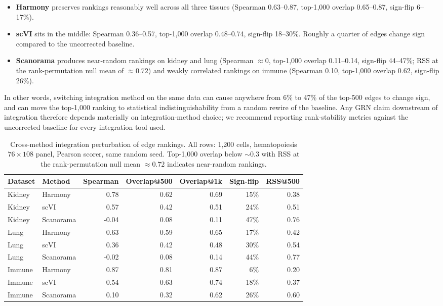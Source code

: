 \documentclass[12pt]{article}
\begin{document}
\begin{itemize}
\item \textbf{Harmony} preserves rankings reasonably well across all
      three tissues (Spearman 0.63--0.87, top-1{,}000 overlap
      0.65--0.87, sign-flip 6--17\%).
\item \textbf{scVI} sits in the middle: Spearman 0.36--0.57, top-1{,}000
      overlap 0.48--0.74, sign-flip 18--30\%. Roughly a quarter of
      edges change sign compared to the uncorrected baseline.
\item \textbf{Scanorama} produces near-random rankings on kidney and
      lung (Spearman $\approx 0$, top-1{,}000 overlap 0.11--0.14,
      sign-flip 44--47\%; RSS at the rank-permutation null mean of
      $\approx 0.72$) and weakly correlated rankings on immune
      (Spearman 0.10, top-1{,}000 overlap 0.62, sign-flip 26\%).
\end{itemize}

In other words, switching integration method on the same data can
cause anywhere from 6\% to 47\% of the top-500 edges to change sign,
and can move the top-1{,}000 ranking to statistical indistinguishability
from a random rewire of the baseline. Any GRN claim downstream of
integration therefore depends materially on integration-method choice;
we recommend reporting rank-stability metrics against the uncorrected
baseline for every integration tool used.

\begin{table}[ht]
\centering
\caption{Cross-method integration perturbation of edge rankings.
All rows: 1{,}200 cells, hematopoiesis $76 \times 108$ panel,
Pearson scorer, same random seed. Top-1{,}000 overlap below $\sim 0.3$
with RSS at the rank-permutation null mean $\approx 0.72$ indicates
near-random rankings.}
\label{tab:integration_methods}
\small
\begin{tabular}{llrrrrr}
\toprule
\textbf{Dataset} & \textbf{Method} & \textbf{Spearman} &
\textbf{Overlap@500} & \textbf{Overlap@1k} &
\textbf{Sign-flip} & \textbf{RSS@500} \\
\midrule
Kidney & Harmony    &  0.78 & 0.62 & 0.69 & 15\% & 0.38 \\
Kidney & scVI       &  0.57 & 0.42 & 0.51 & 24\% & 0.51 \\
Kidney & Scanorama  & -0.04 & 0.08 & 0.11 & 47\% & 0.76 \\
Lung   & Harmony    &  0.63 & 0.59 & 0.65 & 17\% & 0.42 \\
Lung   & scVI       &  0.36 & 0.42 & 0.48 & 30\% & 0.54 \\
Lung   & Scanorama  & -0.02 & 0.08 & 0.14 & 44\% & 0.77 \\
Immune & Harmony    &  0.87 & 0.81 & 0.87 &  6\% & 0.20 \\
Immune & scVI       &  0.54 & 0.63 & 0.74 & 18\% & 0.37 \\
Immune & Scanorama  &  0.10 & 0.32 & 0.62 & 26\% & 0.60 \\
\bottomrule
\end{tabular}
\end{table}
\end{document}
